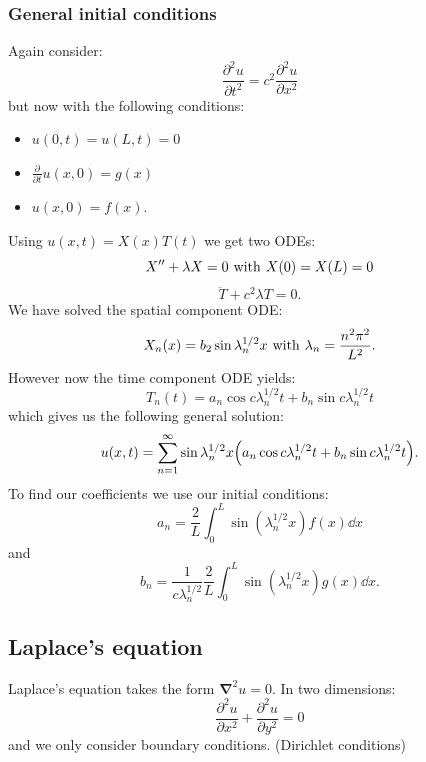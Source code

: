 \documentclass{article}
\begin{document}
\subsubsection{General initial conditions}
Again consider:
$$\frac{\partial^2u}{\partial t^2}=c^2\frac{\partial^2u}{\partial x^2}$$
but now with the following conditions:
\begin{itemize}
    \item $u(0,t)=u(L,t)=0$
    \item $\displaystyle\frac{\partial}{\partial t}
    u(x,0)=g(x)$
    \item $u(x,0)=f(x)$.
\end{itemize}
Using $u(x,t)=X(x)T(t)$ we get two ODEs:
$$X''+\lambda X=0
\hspace{0.05in}\text{with}\hspace{0.05in}
X(0)=X(L)=0$$
$$\ddot{T}+c^2\lambda T=0.$$
We have solved the spatial component ODE:
$$X_n(x)=b_2\sin\lambda_n^{1/2}x
\hspace{0.05in}\text{with}\hspace{0.05in}
\lambda_n=\frac{n^2\pi^2}{L^2}.$$
However now the time component ODE yields:
$$T_n(t)=a_n\cos c\lambda_n^{1/2}t
+b_n\sin c\lambda_n^{1/2}t$$
which gives us the following general solution:
$$u(x,t)=\sum_{n=1}^{\infty}\sin\lambda_n^{1/2}x
\Bigl(a_n\cos c\lambda_n^{1/2}t
+b_n\sin c\lambda_n^{1/2}t\Bigr).$$
To find our coefficients we use our initial conditions:
$$a_n=\frac{2}{L}\int_{0}^{L}
\sin(\lambda_n^{1/2}x)f(x)\dd x$$
and
$$b_n=\frac{1}{c\lambda_n^{1/2}}\frac{2}{L}
\int_{0}^{L}\sin(\lambda_n^{1/2}x)g(x)\dd x.$$

\newpage

\subsection{Laplace's equation}
Laplace's equation takes the form $\boldsymbol{\nabla}^2 u=0$. In two dimensions:
$$\frac{\partial^2 u}{\partial x^2}+\frac{\partial^2 u}{\partial y^2}=0$$
and we only consider boundary conditions. (Dirichlet conditions)
\end{document}
